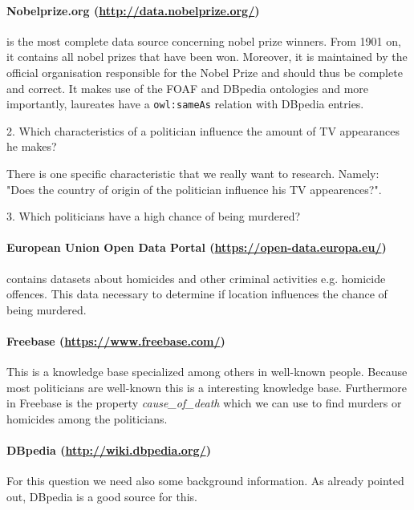 \documentclass[12pt,a4paper]{article}
\begin{document}
\paragraph{\textbf{Nobelprize.org} (\url{http://data.nobelprize.org/})} is the most complete data source concerning nobel prize winners. From 1901 on, it contains all nobel prizes that have been won. Moreover, it is maintained by the official organisation responsible for the Nobel Prize and should thus be complete and correct. It makes use of the FOAF and DBpedia ontologies and more importantly, laureates have a \texttt{owl:sameAs} relation with DBpedia entries.
\vspace{1cm}

\begin{center}
	\Large
2. Which characteristics of a politician influence the amount of TV appearances he makes?
\end{center}

There is one specific characteristic that we really want to research. Namely: "Does the country of origin of the politician influence his TV appearences?". 

\begin{center}
	\Large
3. Which politicians have a high chance of being murdered?
\end{center}

\paragraph{\textbf{European Union Open Data Portal} (\url{https://open-data.europa.eu/})} contains datasets about homicides and other criminal activities e.g. homicide offences. This data necessary to determine if location influences the chance of being murdered.


\paragraph{\textbf{Freebase} (\url{https://www.freebase.com/})} This is a knowledge base specialized among others in well-known people. Because most politicians are well-known this is a interesting knowledge base. Furthermore in Freebase is the property \textit{cause\_of\_death} which we can use to find murders or homicides among the politicians.


\paragraph{\textbf{DBpedia} (\url{http://wiki.dbpedia.org/})}
For this question we need also some background information. As already pointed out, DBpedia is a good source for this.
\end{document}
